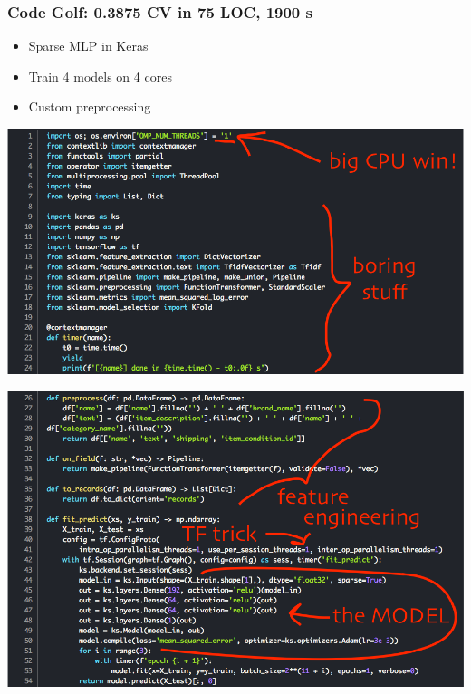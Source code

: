  
\begin{frame}
\frametitle{Code Golf: 0.3875 CV in 75 LOC, 1900 s}

\begin{itemize}
    \item Sparse MLP in Keras
    \item Train 4 models on 4 cores
    \item Custom preprocessing
\end{itemize}

\end{frame}

\begin{frame}
    \includegraphics[width=1.0\textwidth]{img/code_golf_0.png}
\end{frame}

\begin{frame}
    \includegraphics[width=1.0\textwidth]{img/code_golf_1.png}
\end{frame}

